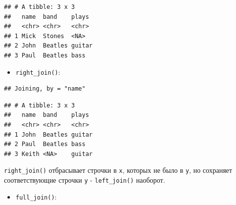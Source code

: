 \documentclass[
]{book}
\newenvironment{Shaded}{\begin{snugshade}}{\end{snugshade}}
\newcommand{\DataTypeTok}[1]{\textcolor[rgb]{0.13,0.29,0.53}{#1}}
\newcommand{\KeywordTok}[1]{\textcolor[rgb]{0.13,0.29,0.53}{\textbf{#1}}}
\newcommand{\NormalTok}[1]{#1}
\newcommand{\OperatorTok}[1]{\textcolor[rgb]{0.81,0.36,0.00}{\textbf{#1}}}
\newcommand{\StringTok}[1]{\textcolor[rgb]{0.31,0.60,0.02}{#1}}
\providecommand{\tightlist}{%
  \setlength{\itemsep}{0pt}\setlength{\parskip}{0pt}}
\begin{document}
\begin{Shaded}
\end{Shaded}

\begin{verbatim}
## # A tibble: 3 x 3
##   name  band    plays 
##   <chr> <chr>   <chr> 
## 1 Mick  Stones  <NA>  
## 2 John  Beatles guitar
## 3 Paul  Beatles bass
\end{verbatim}

\begin{itemize}
\tightlist
\item
  \texttt{right\_join()}:
\end{itemize}

\begin{Shaded}
\end{Shaded}

\begin{verbatim}
## Joining, by = "name"
\end{verbatim}

\begin{verbatim}
## # A tibble: 3 x 3
##   name  band    plays 
##   <chr> <chr>   <chr> 
## 1 John  Beatles guitar
## 2 Paul  Beatles bass  
## 3 Keith <NA>    guitar
\end{verbatim}

\texttt{right\_join()} отбрасывает строчки в \texttt{x}, которых не было в \texttt{y}, но сохраняет соответствующие строчки \texttt{y} - \texttt{left\_join()} наоборот.

\begin{itemize}
\tightlist
\item
  \texttt{full\_join()}:
\end{itemize}

\begin{Shaded}
\end{Shaded}
\end{document}
